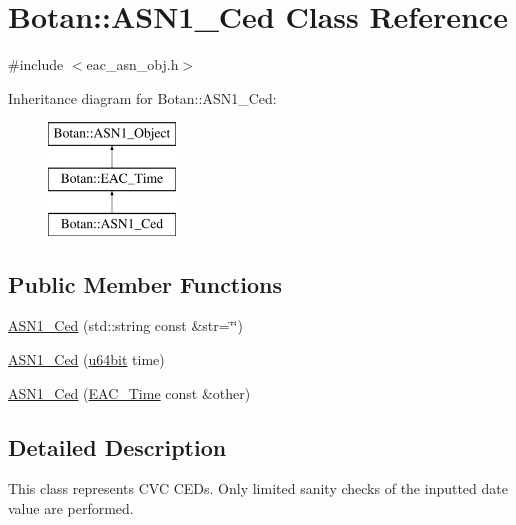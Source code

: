 \hypertarget{classBotan_1_1ASN1__Ced}{\section{Botan\-:\-:A\-S\-N1\-\_\-\-Ced Class Reference}
\label{classBotan_1_1ASN1__Ced}
}


{\ttfamily \#include $<$eac\-\_\-asn\-\_\-obj.\-h$>$}

Inheritance diagram for Botan\-:\-:A\-S\-N1\-\_\-\-Ced\-:\begin{figure}[H]
\begin{center}
\leavevmode
\includegraphics[height=3.000000cm]{classBotan_1_1ASN1__Ced}
\end{center}
\end{figure}
\subsection*{Public Member Functions}
\begin{DoxyCompactItemize}
\item 
\hyperlink{classBotan_1_1ASN1__Ced_a06693252ad3227949e3d5c2a2bb4b2c4}{A\-S\-N1\-\_\-\-Ced} (std\-::string const \&str=\char`\"{}\char`\"{})
\item 
\hyperlink{classBotan_1_1ASN1__Ced_add013c502fddfe21deeaa82ac50bdcef}{A\-S\-N1\-\_\-\-Ced} (\hyperlink{namespaceBotan_a634063d9fb05e25262ca94ed927030f6}{u64bit} time)
\item 
\hyperlink{classBotan_1_1ASN1__Ced_a2d1af2015f9dc9c2b4d80653a412ab2c}{A\-S\-N1\-\_\-\-Ced} (\hyperlink{classBotan_1_1EAC__Time}{E\-A\-C\-\_\-\-Time} const \&other)
\end{DoxyCompactItemize}


\subsection{Detailed Description}
This class represents C\-V\-C C\-E\-Ds. Only limited sanity checks of the inputted date value are performed. 

